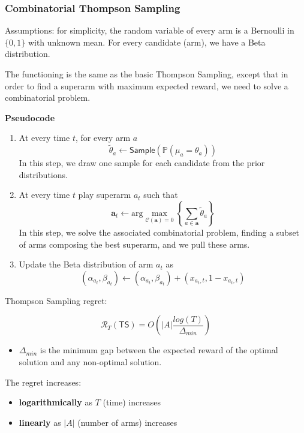 \documentclass[10pt,a4paper]{article}
\begin{document}
\subsubsection{Combinatorial Thompson
Sampling}\label{combinatorial-thompson-sampling}

Assumptions: for simplicity, the random variable of every arm is a Bernoulli in $\{0, 1\}$ with unknown mean. For every candidate (arm), we have a Beta distribution.

The functioning is the same as the basic Thompson Sampling, except that in order to find a superarm with maximum expected reward, we need to solve a combinatorial problem.
\newline

\textbf{Pseudocode}
\begin{shaded}
\begin{enumerate}
\item At every time $t$, for every arm $a$
$$\tilde{\theta}_a \leftarrow \mathsf{Sample}(\mathbb{P}(\mu_a = \theta_a))$$
In this step, we draw one sample for each candidate from the prior distributions.
\item At every time $t$ play superarm $a_t$ such that
$$\mathbf{a}_t \leftarrow \text{arg} \max_{\mathscr{C}(\mathbf{a})= 0} \left\{ \sum_{a \in \mathbf{a}} \tilde{\theta}_a \right\}$$
In this step, we solve the associated combinatorial problem, finding a subset of arms composing the best superarm, and we pull these arms.
\item Update the Beta distribution of arm $a_t$ as
$$(\alpha_{a_t}, \beta_{a_t}) \leftarrow (\alpha_{a_t}, \beta_{a_t}) + (x_{a_t, t}, 1 - x_{a_t, t})$$
\end{enumerate}
\end{shaded}

Thompson Sampling regret:

$$\mathscr{R}_T (\mathsf{TS}) = O \left( |A| \frac{log(T)}{\Delta_{min}}\right)$$

\begin{itemize}

\item $\Delta_{min}$ is the minimum gap between the expected reward of the optimal solution and any non-optimal solution.
\end{itemize}

The regret increases:

\begin{itemize}
\item \textbf{logarithmically} as $T$ (time) increases
\item \textbf{linearly} as $|A|$ (number of arms) increases
\end{itemize}
\end{document}
